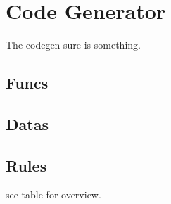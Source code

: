 \section{Code Generator}
The codegen sure is something.
\subsection{Funcs}
\subsection{Datas}
\subsection{Rules}
see table for overview.

